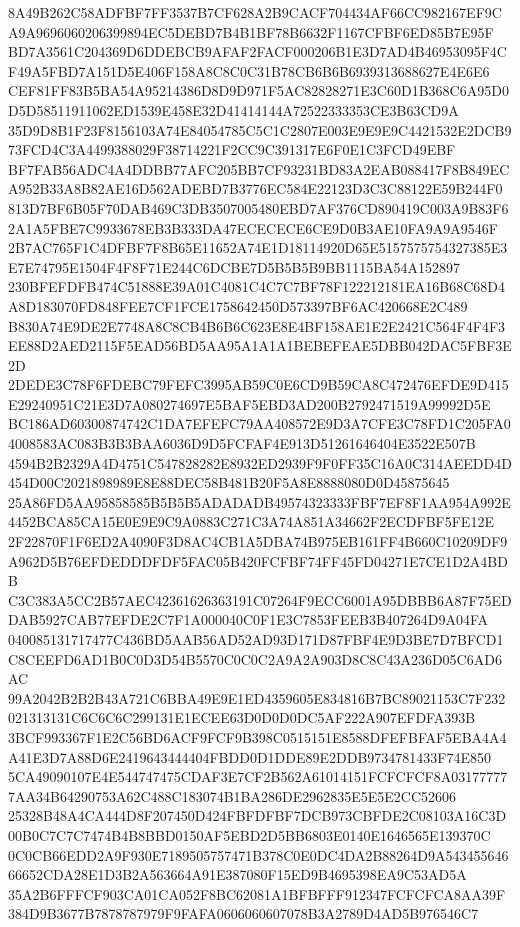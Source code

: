 \documentclass[UTF8,fontset=fandol,zihao=-4,a4paper]{ctexart}
\begin{document}
{{8A49B262C58ADFBF7FF3537B7CF628A2B9CACF704434AF66CC982167EF9CA9A9696060206399894EC5DEBD7B4B1BF78B6632F1167CFBF6ED85B7E95F
BD7A3561C204369D6DDEBCB9AFAF2FACF000206B1E3D7AD4B46953095F4CF49A5FBD7A151D5E406F158A8C8C0C31B78CB6B6B6939313688627E4E6E6
CEF81FF83B5BA54A95214386D8D9D971F5AC82828271E3C60D1B368C6A95D0D5D58511911062ED1539E458E32D41414144A72522333353CE3B63CD9A
35D9D8B1F23F8156103A74E84054785C5C1C2807E003E9E9E9C4421532E2DCB973FCD4C3A4499388029F38714221F2CC9C391317E6F0E1C3FCD49EBF
BF7FAB56ADC4A4DDBB77AFC205BB7CF93231BD83A2EAB088417F8B849ECA952B33A8B82AE16D562ADEBD7B3776EC584E22123D3C3C88122E59B244F0
813D7BF6B05F70DAB469C3DB3507005480EBD7AF376CD890419C003A9B83F62A1A5FBE7C9933678EB3B333DA47ECECECE6CE9D0B3AE10FA9A9A9546F
2B7AC765F1C4DFBF7F8B65E11652A74E1D18114920D65E5157575754327385E3E7E74795E1504F4F8F71E244C6DCBE7D5B5B5B9BB1115BA54A152897
230BFEFDFB474C51888E39A01C4081C4C7C7BF78F122212181EA16B68C68D4A8D183070FD848FEE7CF1FCE1758642450D573397BF6AC420668E2C489
B830A74E9DE2E7748A8C8CB4B6B6C623E8E4BF158AE1E2E2421C564F4F4F3EE88D2AED2115F5EAD56BD5AA95A1A1A1BEBEFEAE5DBB042DAC5FBF3E2D
2DEDE3C78F6FDEBC79FEFC3995AB59C0E6CD9B59CA8C472476EFDE9D415E29240951C21E3D7A080274697E5BAF5EBD3AD200B2792471519A99992D5E
BC186AD60300874742C1DA7EFEFC79AA408572E9D3A7CFE3C78FD1C205FA04008583AC083B3B3BAA6036D9D5FCFAF4E913D51261646404E3522E507B
4594B2B2329A4D4751C547828282E8932ED2939F9F0FF35C16A0C314AEEDD4D454D00C2021898989E8E88DEC58B481B20F5A8E8888080D0D45875645
25A86FD5AA95858585B5B5B5ADADADB49574323333FBF7EF8F1AA954A992E4452BCA85CA15E0E9E9C9A0883C271C3A74A851A34662F2ECDFBF5FE12E
2F22870F1F6ED2A4090F3D8AC4CB1A5DBA74B975EB161FF4B660C10209DF9A962D5B76EFDEDDDFDF5FAC05B420FCFBF74FF45FD04271E7CE1D2A4BDB
C3C383A5CC2B57AEC42361626363191C07264F9ECC6001A95DBBB6A87F75EDDAB5927CAB77EFDE2C7F1A000040C0F1E3C7853FEEB3B407264D9A04FA
040085131717477C436BD5AAB56AD52AD93D171D87FBF4E9D3BE7D7BFCD1C8CEEFD6AD1B0C0D3D54B5570C0C0C2A9A2A903D8C8C43A236D05C6AD6AC
99A2042B2B2B43A721C6BBA49E9E1ED4359605E834816B7BC89021153C7F232021313131C6C6C6C299131E1ECEE63D0D0D0DC5AF222A907EFDFA393B
3BCF993367F1E2C56BD6ACF9FCF9B398C0515151E8588DFEFBFAF5EBA4A4A41E3D7A88D6E2419643444404FBDD0D1DDE89E2DDB9734781433F74E850
5CA49090107E4E544747475CDAF3E7CF2B562A61014151FCFCFCF8A031777777AA34B64290753A62C488C183074B1BA286DE2962835E5E5E2CC52606
25328B48A4CA444D8F207450D424FBFDFBF7DCB973CBFDE2C08103A16C3D00B0C7C7C7474B4B8BBD0150AF5EBD2D5BB6803E0140E1646565E139370C
0C0CB66EDD2A9F930E7189505757471B378C0E0DC4DA2B88264D9A54345564666652CDA28E1D3B2A563664A91E387080F15ED9B4695398EA9C53AD5A
35A2B6FFFCF903CA01CA052F8BC62081A1BFBFFF912347FCFCFCA8AA39F384D9B3677B7878787979F9FAFA0606060607078B3A2789D4AD5B976546C7
}}
\end{document}
